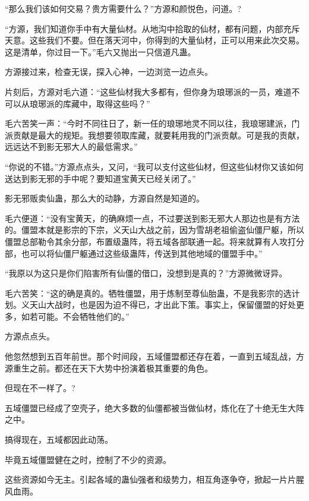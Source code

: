 
\begin{this_body}

“那么我们该如何交易？贵方需要什么？”方源和颜悦色，问道。?

“方源，我们知道你手中有大量仙材。从地沟中拾取的仙材，都有问题，内部充斥天意。这些我们不要。但在落天河中，你得到的大量仙材，正可以用来此次交易。这是清单，你过目一下。”毛六又抛出一只信道凡蛊。

方源接过来，检查无误，探入心神，一边浏览一边点头。

片刻后，方源对毛六道：“这些仙材我大多都有，但你身为琅琊派的一员，难道不可以从琅琊派的库藏中，取得这些吗？”

毛六苦笑一声：“今时不同往日了，新一任的琅琊地灵不同以往，我琅琊建派，门派贡献是最大的规矩。我想要领取库藏，就要耗用我的门派贡献。可是我的贡献，远远达不到影无邪大人的最低需求。”

“你说的不错。”方源点点头，又问，“我可以支付这些仙材，但这些仙材你又该如何送达到影无邪的手中呢？要知道宝黄天已经关闭了。”

影无邪贩卖仙蛊，那么大的动静，方源自然是知道的。

毛六便道：“没有宝黄天，的确麻烦一点，不过要送到影无邪大人那边也是有方法的。僵盟本就是影宗的下宗，义天山大战之前，因为雪胡老祖偷盗仙僵尸躯，所以僵盟总部勒令其余分部，布置级蛊阵，将五域各部联通一起。将来就算有人攻打分部，也可以将仙僵尸躯通过这些级蛊阵，传送到其他地域的僵盟手中。”

“我原以为这只是你们陷害所有仙僵的借口，没想到是真的？”方源微微讶异。

毛六苦笑：“这的确是真的。牺牲僵盟，用于炼制至尊仙胎蛊，不是我影宗的选计划。义天山大战时，也是因为迫不得已，才出此下策。事实上，保留僵盟的好处更多，如若可能。不会牺牲他们的。”

方源点点头。

他忽然想到五百年前世。那个时间段，五域僵盟都还存在着，一直到五域乱战，方源重生之前。都还在天下大势中扮演着极其重要的角色。

但现在不一样了。?

五域僵盟已经成了空壳子，绝大多数的仙僵都被当做仙材，炼化在了十绝无生大阵之中。

搞得现在，五域都因此动荡。

毕竟五域僵盟健在之时，控制了不少的资源。

这些资源如今无主。引起各域的蛊仙强者和级势力，相互角逐争夺，掀起一片片腥风血雨。


\end{this_body}
